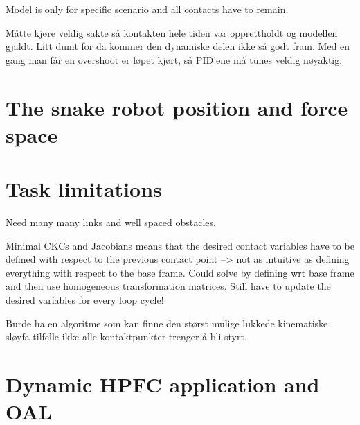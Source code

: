 Model is only for specific scenario and all contacts have to remain.

Måtte kjøre veldig sakte så kontakten hele tiden var opprettholdt og modellen gjaldt. Litt dumt for da kommer den dynamiske delen ikke så godt fram.
Med en gang man får en overshoot er løpet kjørt, så PID'ene må tunes veldig nøyaktig.

\section{The snake robot position and force space}

\section{Task limitations}

Need many many links and well spaced obstacles.

Minimal CKCs and Jacobians means that the desired contact variables have to be defined with respect to the previous contact point --> not as intuitive as defining everything with respect to the base frame. Could solve by defining wrt base frame and then use homogeneous transformation matrices. Still have to update the desired variables for every loop cycle!

Burde ha en algoritme som kan finne den størst mulige lukkede kinematiske sløyfa tilfelle ikke alle kontaktpunkter trenger å bli styrt.

\section{Dynamic HPFC application and OAL}
